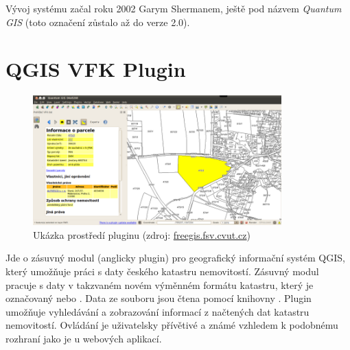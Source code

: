 Vývoj systému začal roku 2002 Garym Shermanem, ještě pod názvem
\textit {Quantum GIS} (toto označení zůstalo až do verze 2.0).\cite{qgis_official, qgis_wiki_en, qgis_wiki_cz}
 
\section{QGIS VFK Plugin}
\label{sec:qgis_plugin}
\begin{figure}[H]
	 \centering
      \includegraphics[height=5cm]{./pictures/Qgisvfkplugin.png}
      \caption{Ukázka prostředí pluginu (zdroj:
\href{http://freegis.fsv.cvut.cz/wiki/images/4/4b/Qgisvfkplugin-screenshot-05.png}{freegis.fsv.cvut.cz})}
      \label{fig:qgis_vfk_plugin}
  \end{figure}

Jde o zásuvný modul (anglicky plugin) pro geografický informační systém
QGIS, který umožňuje práci s daty českého katastru
nemovitostí. Zásuvný modul pracuje s daty v takzvaném novém
výměnném formátu katastru, který je označovaný  nebo
. Data ze souboru jsou čtena pomocí knihovny . Plugin
umožňuje vyhledávání a zobrazování informací z načtených dat katastru
nemovitostí. Ovládání je uživatelsky přívětivé a známé vzhledem k
podobnému rozhraní jako je u webových aplikací.

